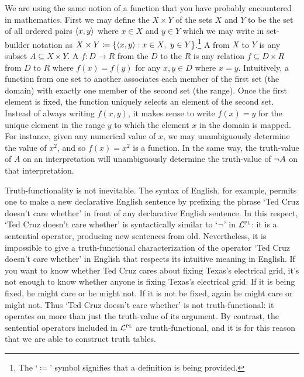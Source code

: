 We are using the same notion of a function that you have probably encountered in mathematics.
First we may define the  $X \times Y$ of the sets $X$ and $Y$ to be the set of all ordered pairs $\langle x, y\rangle$ where $x \in X$ and $y \in Y$ which we may write in set-builder notation as $X \times Y \coloneq \lbrace\langle x, y\rangle : x \in X,\ y \in Y\rbrace$.\footnote{The `$\coloneq$' symbol signifies that a definition is being provided.}
A  from $X$ to $Y$ is any subset $A \subseteq X \times Y$.
A  $f: D \to R$ from the  $D$ to the  $R$ is any relation $f \subseteq D \times R$ from $D$ to $R$ where $f(x) = f(y)$ for any $x, y \in D$ where $x = y$. 
Intuitively, a function from one set to another associates each member of the first set (the domain) with exactly one member of the second set (the range).
Once the first element is fixed, the function uniquely selects an element of the second set.
Instead of always writing $f(x, y)$, it makes sense to write $f(x) = y$ for the unique element in the range $y$ to which the element $x$ in the domain is mapped.
For instance, given any numerical value of $x$, we may unambiguously determine the value of $x^{2}$, and so $f(x)=x^{2}$ is a function.
In the same way, the truth-value of $A$ on an interpretation will unambiguously determine the truth-value of $\neg A$ on that interpretation.

Truth-functionality is not inevitable.
The syntax of English, for example, permits one to make a new declarative English sentence by prefixing the phrase `Ted Cruz doesn't care whether' in front of any declarative English sentence.
In this respect, `Ted Cruz doesn't care whether' is syntactically similar to `$\neg$' in $\mathcal{L}^{\textsc{pl}}$: it is a sentential operator, producing new sentences from old. 
Nevertheless, it is impossible to give a truth-functional characterization of the operator `Ted Cruz doesn't care whether' in English that respects its intuitive meaning in English.
If you want to know whether Ted Cruz cares about fixing Texas's electrical grid, it's not enough to know whether anyone is fixing Texas's electrical grid.
If it is being fixed, he might care or he might not.
If it is not be fixed, again he might care or might not. 
Thus `Ted Cruz doesn't care whether' is not truth-functional: it operates on more than just the truth-value of its argument. %
By contrast, the sentential operators included in $\mathcal{L}^{\textsc{pl}}$ are truth-functional, and it is for this reason that we are able to construct truth tables.



